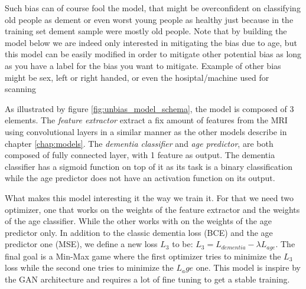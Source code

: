 Such bias can of course fool the model, that might be overconfident on classifying old people as dement or even worst young people as healthy just because in the training set dement sample were mostly old people.
Note that by building the model below we are indeed only interested in mitigating the bias due to age, but this model can be easily modified in order to mitigate other potential bias as long as you have a label for the bias you want to mitigate. Example of other bias might be sex, left or right handed, or even the hosiptal/machine used for scanning


As illustrated by figure \ref{fig:unbias_model_schema}, the model is composed of 3 elements. The \textit{feature extractor} extract a fix amount of features from the MRI using convolutional layers in a similar manner as the other models describe in chapter \ref{chap:models}. The \textit{dementia classifier} and \textit{age predictor}, are both composed of fully connected layer, with 1 feature as output. The dementia classifier has a sigmoid function on top of it as its task is a binary classification while the age predictor does not have an activation function on its output.

What makes this model interesting it the way we train it. For that we need two optimizer, one that works on the weights of the feature extractor and the weights of the age classifier. While the other works with on the weights of the age predictor only. In addition to the classic dementia loss (BCE) and the age predictor one (MSE), we define a new loss $L_{3}$ to be: $L_3 = L_{dementia} - \lambda L_{age}$. The final goal is a Min-Max game where the first optimizer tries to minimize the $L_3$ loss while the second one tries to minimize the $L_age$ one. This model is inspire by the GAN\cite{goodfellow2014generative} architecture and requires a lot of fine tuning to get a stable training.  
